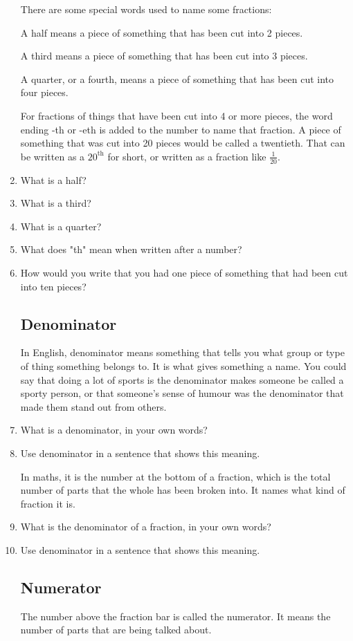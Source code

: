 \documentclass[14pt]{article}
\begin{document}
\begin{enumerate}
There are some special words used to name some fractions:

A half means a piece of something that has been cut into 2 pieces.

A third means a piece of something that has been cut into 3 pieces.

A quarter, or a fourth, means a piece of something that has been cut into four pieces.

For fractions of things that have been cut into 4 or more pieces, the word ending -th or -eth is added to the number to name that fraction. A piece of something that was cut into 20 pieces would be called a twentieth. That can be written as a $20^{\textrm{th}}$ for short, or written as a fraction like $\frac{1}{20}$.\\

\item What is a half?
\item What is a third?
\item What is a quarter?
\item What does "th" mean when written after a number?
\item How would you write that you had one piece of something that had been cut into ten pieces?

\subsection*{Denominator}
In English, denominator means something that tells you what group or type of thing something belongs to. It is what gives something a name. 
You could say that doing a lot of sports is the denominator makes someone be called a sporty person, or that someone's sense of humour was the denominator that made them stand out from others.

\item What is a denominator, in your own words?
\item Use denominator in a sentence that shows this meaning.

In maths, it is the number at the bottom of a fraction, which is the total number of parts that the whole has been broken into. It names what kind of fraction it is.

\item What is the denominator of a fraction, in your own words?
\item Use denominator in a sentence that shows this meaning.

\subsection*{Numerator}
The number above the fraction bar is called the numerator. It means the number of parts that are being talked about.\\


\end{enumerate}
\end{document}
